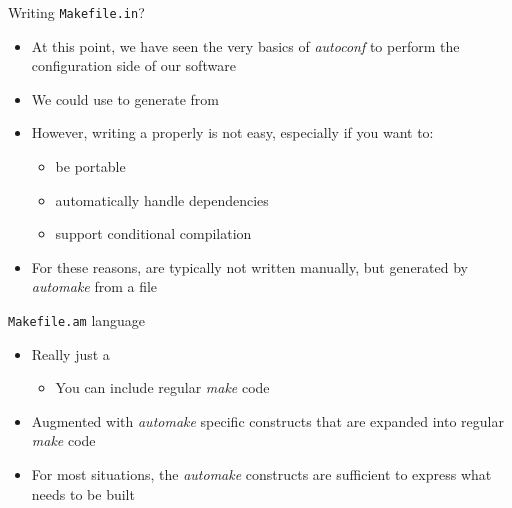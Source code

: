 \begin{frame}{Writing {\tt Makefile.in}?}
  \begin{itemize}
  \item At this point, we have seen the very basics of {\em autoconf}
    to perform the configuration side of our software
  \item We could use  to generate
     from 
  \item However, writing a  properly is not easy,
    especially if you want to:
    \begin{itemize}
    \item be portable
    \item automatically handle dependencies
    \item support conditional compilation
    \end{itemize}
  \item For these reasons,  are typically not
    written manually, but generated by {\em automake} from a
     file
  \end{itemize}
\end{frame}

\begin{frame}{{\tt Makefile.am} language}
  \begin{itemize}
  \item Really just a 
    \begin{itemize}
    \item You can include regular {\em make} code
    \end{itemize}
  \item Augmented with {\em automake} specific constructs that are
    expanded into regular {\em make} code
  \item For most situations, the {\em automake} constructs are
    sufficient to express what needs to be built
  \end{itemize}
\end{frame}

